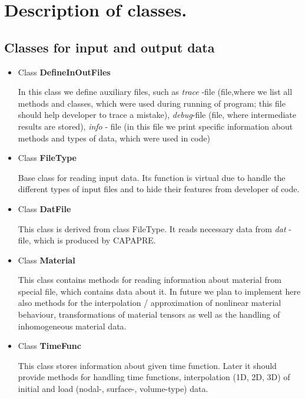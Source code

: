 \section{ Description of classes. }
%
\subsection{ Classes for input and output data}
\begin{itemize}
%
\item{ Class {\bf DefineInOutFiles}} \\
\begin{print}
In this class we define auxiliary files, such as {\it trace }-file (file,where we list all methods and classes, which were used during running of program; this file should help developer to trace a mistake), {\it debug}-file (file, where intermediate results are stored), {\it info} - file (in this file we print specific information about methods and types of data, which were used in code)
\end{print}
%
\item{ Class {\bf FileType}} \\
\begin{print}
Base class for reading input data. Its function is virtual due to handle the different types of input files and to hide their features from developer of code.
\end{print}
%
\item{ Class {\bf DatFile}} \\
\begin{print}
This class is derived from class FileType. It reads necessary data from {\it dat} - file, which is produced by CAPAPRE.
\end{print}
%
\item{ Class {\bf Material}} \\
\begin{print}
This class contains methods for reading information about material from special file, which contains data about it. In future we plan to implement here also methods for the interpolation / approximation of nonlinear material behaviour, transformations of material tensors as well as the handling of inhomogeneous material data.
\end{print}
%
\item{ Class {\bf TimeFunc}} \\
\begin{print}
This class stores information about given time function. Later it should provide methods for handling time functions, interpolation (1D, 2D, 3D) of initial and load (nodal-, surface-, volume-type) data.\\

\end{print}
\end{itemize}
